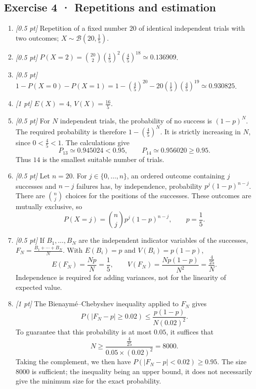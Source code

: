 \subsection*{Exercise 4 · Repetitions and estimation}\begin{enumerate}

\item \textit{[0.5 pt]} Repetition of a fixed number $20$ of identical independent trials with two outcomes; $X\sim\mathcal B(20,\frac{1}{5})$.

\item \textit{[0.5 pt]} $P(X=2)=\binom{20}2(\frac{1}{5})^2(\frac{4}{5})^{18}\simeq0.136909$.

\item \textit{[0.5 pt]} $1-P(X=0)-P(X=1)=1-(\frac{4}{5})^{20}-20(\frac{1}{5})(\frac{4}{5})^{19}\simeq0.930825$.

\item \textit{[1 pt]} $E(X)=4$, $V(X)=\frac{16}{5}$.

\item \textit{[0.5 pt]} For $N$ independent trials, the probability of no success is $(1-p)^N$. The required probability is therefore $1-(\frac{4}{5})^N$. It is strictly increasing in $N$, since $0<\frac{4}{5}<1$. The calculations give
\[P_{13}\simeq0.945024<0.95,\qquad P_{14}\simeq0.956020\ge0.95.\]
Thus $14$ is the smallest suitable number of trials.

\item \textit{[0.5 pt]} Let $n=20$. For $j\in\{0,\ldots,n\}$, an ordered outcome containing $j$ successes and $n-j$ failures has, by independence, probability $p^j(1-p)^{n-j}$. There are $\binom nj$ choices for the positions of the successes. These outcomes are mutually exclusive, so
\[P(X=j)=\binom nj p^j(1-p)^{n-j},\qquad p=\frac{1}{5}.\]

\item \textit{[0.5 pt]} If $B_1,\ldots,B_N$ are the independent indicator variables of the successes, $F_N=\frac{B_1+\cdots+B_N}{N}$. With $E(B_i)=p$ and $V(B_i)=p(1-p)$,
\[E(F_N)=\frac{Np}{N}=\frac{1}{5},\qquad V(F_N)=\frac{Np(1-p)}{N^2}=\frac{\frac{4}{25}}{N}.\]
Independence is required for adding variances, not for the linearity of expected value.

\item \textit{[1 pt]} The Bienaymé–Chebyshev inequality applied to $F_N$ gives
\[P(|F_N-p|\ge0.02)\le\frac{p(1-p)}{N(0.02)^2}.\]
To guarantee that this probability is at most $0.05$, it suffices that
\[N\ge\frac{\frac{4}{25}}{0.05\times(0.02)^2}=8000.\]
Taking the complement, we then have $P(|F_N-p|<0.02)\ge0.95$. The size $8000$ is sufficient; the inequality being an upper bound, it does not necessarily give the minimum size for the exact probability.

\end{enumerate}

